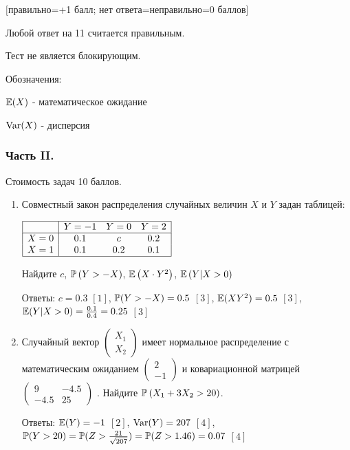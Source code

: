 \documentclass[12pt, a4paper]{article}\usepackage[]{graphicx}\usepackage[]{color}
\begin{document}
$[$правильно=+1 балл; нет ответа=неправильно=0 баллов$]$

Любой ответ на 11 считается правильным.

Тест не является блокирующим.

Обозначения:

$\E(X)$ - математическое ожидание

$\Var(X)$ - дисперсия

\subsubsection*{Часть II.}

Стоимость задач 10 баллов.

\begin{enumerate}
\item Совместный закон распределения случайных величин  $X$  и  $Y$
задан таблицей:

$\begin{array}{|c|ccc|} \hline {} & {Y=-1} & {Y=0} & {Y=2}
\\  \hline {X=0} & {0.1} & {c} & {0.2}
\\ {X=1} & {0.1} & {0.2} & {0.1} \\  \hline  \end{array}$

Найдите  $c$,  $\P\left(Y>-X\right)$,  $\E\left(X\cdot Y^{2} \right)$,  $\E\left(Y|X>0\right)$

Ответы: $c=0.3$ $[1]$, $\P(Y>-X)=0.5$ $[3]$, $\E(XY^{2})=0.5$ $[3]$,
$\E(Y|X>0)=\frac{0.1}{0.4}=0.25$ $[3]$

\item Случайный вектор  $\left(\begin{array}{c}
{X_{1} } \\ {X_{2} }
\end{array}\right)$  имеет нормальное распределение с
математическим ожиданием  $\left(\begin{array}{c} {2} \\ {-1}
\end{array}\right)$  и ковариационной матрицей
$\left(\begin{array}{cc} {9} & {-4.5} \\ {-4.5} & {25}
\end{array}\right)$ . Найдите  $\P\left(X_{1} +3X_{2} >20\right)$.

Ответы: $\E(Y)=-1$ $[2]$, $\Var(Y)=207$ $[4]$, $\P(Y>20)=\P(Z>\frac{21}{\sqrt{207}})=\P(Z>1.46)=0.07$ $[4]$


\end{enumerate}
\end{document}
